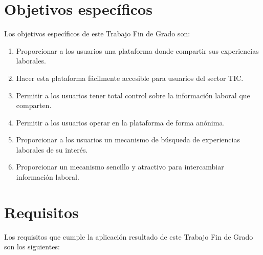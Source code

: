 \documentclass[a4paper, 12pt]{book}
\begin{document}
    \section{Objetivos específicos}
    \label{sec:target_specifictargets}

    Los objetivos específicos de este Trabajo Fin de Grado son:

    \begin{enumerate}
        \item Proporcionar a los usuarios una plataforma donde compartir sus experiencias laborales.
        \item Hacer esta plataforma fácilmente accesible para usuarios del sector TIC.
        \item Permitir a los usuarios tener total control sobre la información laboral que comparten.
        \item Permitir a los usuarios operar en la plataforma de forma anónima.
        \item Proporcionar a los usuarios un mecanismo de búsqueda de experiencias laborales de su interés.
        \item Proporcionar un mecanismo sencillo y atractivo para intercambiar información laboral.
    \end{enumerate}


    \section{Requisitos}
    \label{sec:target_rquirements}

    Los requisitos que cumple la aplicación resultado de este Trabajo Fin de Grado son los siguientes:
\end{document}
